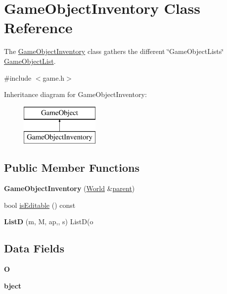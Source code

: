 \hypertarget{class_game_object_inventory}{\section{\-Game\-Object\-Inventory \-Class \-Reference}
\label{class_game_object_inventory}
}


\-The \hyperlink{class_game_object_inventory}{\-Game\-Object\-Inventory} class gathers the different \char`\"{}\-Game\-Object\-Lists\char`\"{} \hyperlink{class_game_object_list}{\-Game\-Object\-List}.  




{\ttfamily \#include $<$game.\-h$>$}

\-Inheritance diagram for \-Game\-Object\-Inventory\-:\begin{figure}[H]
\begin{center}
\leavevmode
\includegraphics[height=2.000000cm]{class_game_object_inventory}
\end{center}
\end{figure}
\subsection*{\-Public \-Member \-Functions}
\begin{DoxyCompactItemize}
\item 
\hypertarget{class_game_object_inventory_a3b77e1bfe5cdac93a4eadcacc904ad60}{{\bfseries \-Game\-Object\-Inventory} (\hyperlink{class_world}{\-World} \&\hyperlink{class_game_object_af3deaf39cde23c189765634e32e95bb4}{parent})}\label{class_game_object_inventory_a3b77e1bfe5cdac93a4eadcacc904ad60}

\item 
bool \hyperlink{class_game_object_inventory_a0c7527f8b3d6a64c4776e3aef924066a}{is\-Editable} () const 
\item 
\hypertarget{class_game_object_inventory_a76c89515ba324188e54c6289dbd12f8a}{{\bfseries \-List\-D} (m, \-M, ap,, s) \-List\-D(o}\label{class_game_object_inventory_a76c89515ba324188e54c6289dbd12f8a}

\end{DoxyCompactItemize}
\subsection*{\-Data \-Fields}
\begin{DoxyCompactItemize}
\item 
\hypertarget{class_game_object_inventory_af83bab23ab6edd8ed14f182abfae9d18}{{\bfseries \-O}}\label{class_game_object_inventory_af83bab23ab6edd8ed14f182abfae9d18}

\item 
\hypertarget{class_game_object_inventory_a89fbd64e3f8d9086d5d87414845d1b33}{{\bfseries bject}}\label{class_game_object_inventory_a89fbd64e3f8d9086d5d87414845d1b33}

\end{DoxyCompactItemize}


